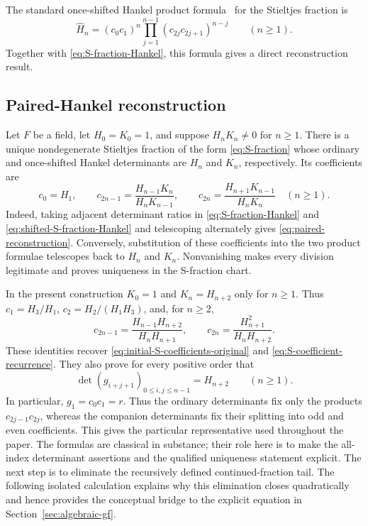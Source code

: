 \documentclass[11pt]{article}
\theoremstyle{remark}
\begin{document}
The standard once-shifted Hankel product formula~\cite{Krattenthaler2005} for the Stieltjes fraction is
\begin{equation}
 \widehat H_n=(c_0c_1)^n\prod_{j=1}^{n-1}(c_{2j}c_{2j+1})^{n-j}
 \qquad(n\geq1).
 \label{eq:shifted-S-fraction-Hankel}
\end{equation}
Together with \eqref{eq:S-fraction-Hankel}, this formula gives a direct
reconstruction result.

\subsection{Paired-Hankel reconstruction}
Let $F$ be a field, let $H_0=K_0=1$, and suppose $H_nK_n\ne0$ for
$n\geq1$.  There is a unique nondegenerate Stieltjes fraction of the form
\eqref{eq:S-fraction} whose ordinary and once-shifted Hankel determinants
are $H_n$ and $K_n$, respectively.  Its coefficients are
\begin{equation}
 c_0=H_1,\qquad
 c_{2n-1}=\frac{H_{n-1}K_n}{H_nK_{n-1}},\qquad
 c_{2n}=\frac{H_{n+1}K_{n-1}}{H_nK_n}\quad(n\geq1).
 \label{eq:paired-reconstruction}
\end{equation}
Indeed, taking adjacent determinant ratios in
\eqref{eq:S-fraction-Hankel} and
\eqref{eq:shifted-S-fraction-Hankel} and telescoping alternately gives
\eqref{eq:paired-reconstruction}.  Conversely, substitution of these
coefficients into the two product formulae telescopes back to $H_n$ and
$K_n$.  Nonvanishing makes every division legitimate and proves uniqueness
in the S-fraction chart.

In the present construction $K_0=1$ and $K_n=H_{n+2}$ only for $n\geq1$.
Thus $c_1=H_3/H_1$, $c_2=H_2/(H_1H_3)$, and, for $n\geq2$,
\begin{equation}
 c_{2n-1}=\frac{H_{n-1}H_{n+2}}{H_nH_{n+1}},\qquad
 c_{2n}=\frac{H_{n+1}^2}{H_nH_{n+2}}.
 \label{eq:paired-reconstruction-special}
\end{equation}
These identities recover \eqref{eq:initial-S-coefficients-original} and
\eqref{eq:S-coefficient-recurrence}.  They also prove for every positive
order that
\begin{equation}
 \det(g_{i+j+1})_{0\leq i,j\leq n-1}=H_{n+2}\qquad(n\geq1).
 \label{eq:literal-shifted-Hankel}
\end{equation}
In particular, $g_1=c_0c_1=r$.  Thus the ordinary determinants fix only the
products $c_{2j-1}c_{2j}$, whereas the companion determinants fix their
splitting into odd and even coefficients.  This gives the particular
representative used throughout the paper.  The formulas are classical in
substance; their role here is to make the all-index determinant assertions
and the qualified uniqueness statement explicit.  The next step is to eliminate the recursively defined continued-fraction
tail. The following isolated calculation explains why this elimination closes
quadratically and hence provides the conceptual bridge to the explicit equation
in Section~\ref{sec:algebraic-gf}.
\end{document}
